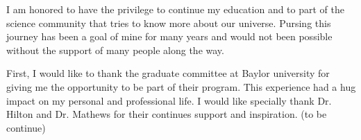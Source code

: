 

I am honored to have the privilege to continue my education and to part of the science community that tries to know more about our universe. 
Pursing this journey has been a goal of mine for many years and would not been possible without the support of many people along the way. 

First, I would like to thank the graduate committee at Baylor university for giving me the opportunity to be part of their program. This experience had a hug impact on my personal and professional life. I would like specially thank Dr. Hilton and Dr. Mathews for their continues support and inspiration. (to be continue)



